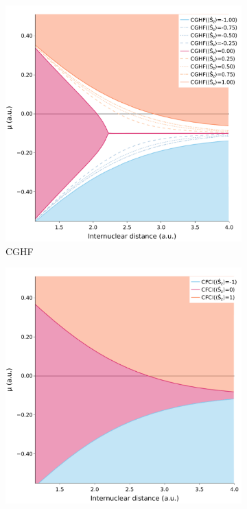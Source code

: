\documentclass[journal=jctc,manuscript=article]{achemso}
\begin{document}
        \begin{figure}
            \centering
            \begin{subfigure}[h]{0.45\textwidth}
                \centering
                \includegraphics[width=\textwidth]{GHF-spin-phase-diagram(H2)(med-B)}
                \caption{CGHF}
                \label{fig:GHF-spin-phase-diagram-H2}
            \end{subfigure}
            \begin{subfigure}[]{0.45\textwidth}
                \centering
                \includegraphics[width=\textwidth]{FCI-spin-phase-diagram(H2)(med-B)}

\end{subfigure}
\end{figure}
\end{document}

